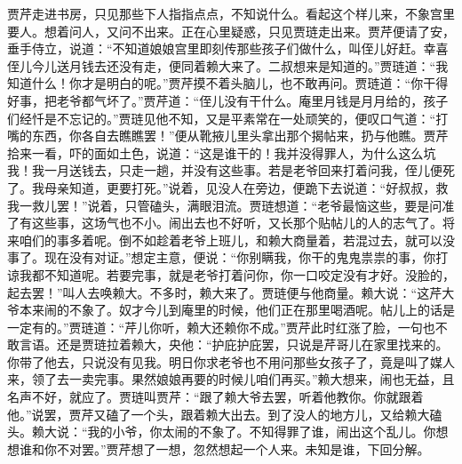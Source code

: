 \begin{parag}
    贾芹走进书房，只见那些下人指指点点，不知说什么。看起这个样儿来，不象宫里要人。想着问人，又问不出来。正在心里疑惑，只见贾琏走出来。贾芹便请了安，垂手侍立，说道：“不知道娘娘宫里即刻传那些孩子们做什么，叫侄儿好赶。幸喜侄儿今儿送月钱去还没有走，便同着赖大来了。二叔想来是知道的。”贾琏道：“我知道什么！你才是明白的呢。”贾芹摸不着头脑儿，也不敢再问。贾琏道：“你干得好事，把老爷都气坏了。”贾芹道：“侄儿没有干什么。庵里月钱是月月给的，孩子们经忏是不忘记的。”贾琏见他不知，又是平素常在一处顽笑的，便叹口气道：“打嘴的东西，你各自去瞧瞧罢！”便从靴掖儿里头拿出那个揭帖来，扔与他瞧。贾芹拾来一看，吓的面如土色，说道：“这是谁干的！我并没得罪人，为什么这么坑我！我一月送钱去，只走一趟，并没有这些事。若是老爷回来打着问我，侄儿便死了。我母亲知道，更要打死。”说着，见没人在旁边，便跪下去说道：“好叔叔，救我一救儿罢！”说着，只管磕头，满眼泪流。贾琏想道：“老爷最恼这些，要是问准了有这些事，这场气也不小。闹出去也不好听，又长那个贴帖儿的人的志气了。将来咱们的事多着呢。倒不如趁着老爷上班儿，和赖大商量着，若混过去，就可以没事了。现在没有对证。”想定主意，便说：“你别瞒我，你干的鬼鬼祟祟的事，你打谅我都不知道呢。若要完事，就是老爷打着问你，你一口咬定没有才好。没脸的，起去罢！”叫人去唤赖大。不多时，赖大来了。贾琏便与他商量。赖大说：“这芹大爷本来闹的不象了。奴才今儿到庵里的时候，他们正在那里喝酒呢。帖儿上的话是一定有的。”贾琏道：“芹儿你听，赖大还赖你不成。”贾芹此时红涨了脸，一句也不敢言语。还是贾琏拉着赖大，央他：“护庇护庇罢，只说是芹哥儿在家里找来的。你带了他去，只说没有见我。明日你求老爷也不用问那些女孩子了，竟是叫了媒人来，领了去一卖完事。果然娘娘再要的时候儿咱们再买。”赖大想来，闹也无益，且名声不好，就应了。贾琏叫贾芹：“跟了赖大爷去罢，听着他教你。你就跟着他。”说罢，贾芹又磕了一个头，跟着赖大出去。到了没人的地方儿，又给赖大磕头。赖大说：“我的小爷，你太闹的不象了。不知得罪了谁，闹出这个乱儿。你想想谁和你不对罢。”贾芹想了一想，忽然想起一个人来。未知是谁，下回分解。
\end{parag}